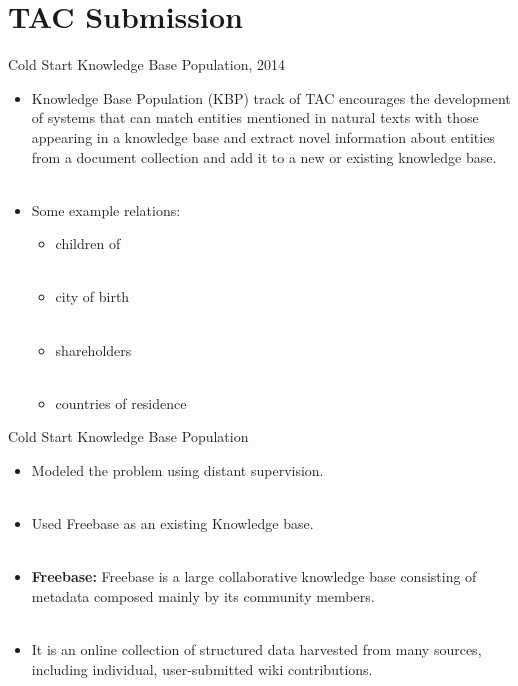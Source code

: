 \documentclass{beamer}
\begin{document}
\section{TAC Submission}
\begin{frame}{Cold Start Knowledge Base Population, 2014}
\begin{itemize}
 
 \item Knowledge Base Population (KBP) track of TAC encourages the development of systems that can match entities mentioned in natural texts with those
appearing in a knowledge base and extract novel information about entities from a document collection and add it to a new or existing knowledge base. \pause \\~\\
 
 \item Some example relations: 
    \begin{itemize}
      \item children of \\~\\
      \item city of birth \\~\\ 
      \item shareholders \\~\\
      \item countries of residence
    \end{itemize}
\end{itemize}

\end{frame}
\begin{frame}{Cold Start Knowledge Base Population}

\begin{itemize}
  \item  Modeled the problem using distant supervision. \\~\\
  \item Used Freebase as an existing Knowledge base. \\~\\
    
    \item \textbf{Freebase: }Freebase is a large collaborative knowledge base consisting of metadata composed mainly by its community members. \\~\\ 
    \item It is an online collection of structured data harvested from many sources, including individual, user-submitted wiki contributions.
 \end{itemize}

 
\end{frame}
\end{document}
